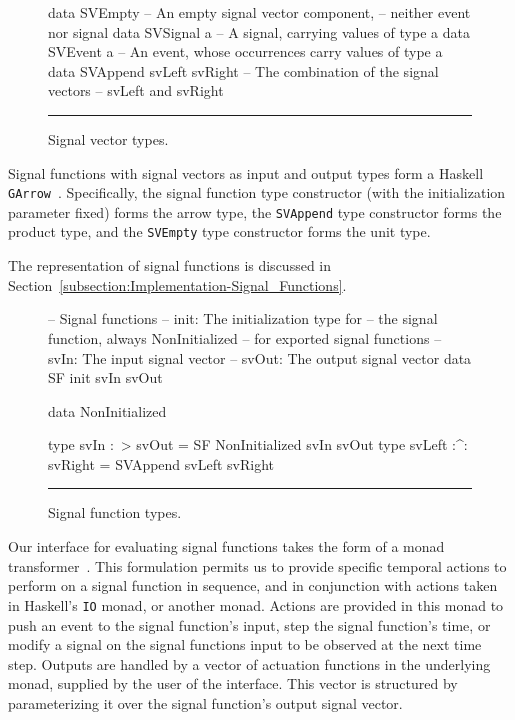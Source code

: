 \begin{figure}
\begin{code}
data SVEmpty    -- An empty signal vector component,
                -- neither event nor signal
data SVSignal a -- A signal, carrying values of type a
data SVEvent a  -- An event, whose occurrences carry values of type a
data SVAppend svLeft svRight -- The combination of the signal vectors
                             -- svLeft and svRight
\end{code}
\hrule
\caption{Signal vector types.}
\label{figure:signal_vector_types}
\end{figure}

Signal functions with signal vectors as input and output types form a
Haskell {\tt GArrow}~\cite{Megacz2011}. Specifically, the signal function
type constructor (with the initialization parameter fixed) forms the arrow
type, the {\tt SVAppend} type constructor forms the product type, and the
{\tt SVEmpty} type constructor forms the unit type.

The representation of signal functions is discussed in
Section~\ref{subsection:Implementation-Signal_Functions}.
\begin{figure}
\begin{code}
-- Signal functions
-- init: The initialization type for 
--   the signal function, always NonInitialized
--   for exported signal functions
-- svIn: The input signal vector
-- svOut: The output signal vector
data SF init svIn svOut

data NonInitialized

type svIn :~> svOut = SF NonInitialized svIn svOut
type svLeft :^: svRight = SVAppend svLeft svRight
\end{code}
\hrule
\caption{Signal function types.}
\label{figure:signal_function_types}
\end{figure}

Our interface for evaluating signal functions takes the form of a monad
transformer~\cite{Jones1995}. This formulation permits us to provide specific
temporal actions to perform on a signal function in sequence, and in conjunction
with actions taken in Haskell's {\tt IO} monad, or another monad. Actions are
provided in this monad to push an event to the signal function's input, step
the signal function's time, or modify a signal on the signal functions input to
be observed at the next time step. Outputs are handled by a vector of actuation
functions in the underlying monad, supplied by the user of the interface. This
vector is structured by parameterizing it over the signal function's output
signal vector.

